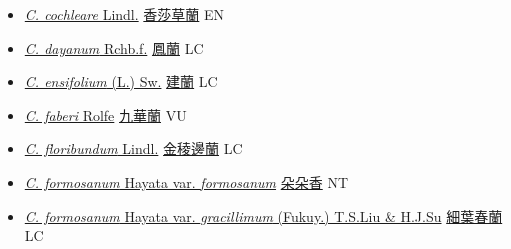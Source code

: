 \begin{itemize}
  \begin{itemize}
        \item[] \href{http://www.theplantlist.org/tpl1.1/search?q=Cymbidium+cochleare}{\textit{C. cochleare} Lindl.}   \href{\detokenize{http://taibnet.sinica.edu.tw/chi/taibnet_species_list.php?T2=香莎草蘭&T2_new_value=true&fr=y}}{香莎草蘭} EN
        \item[] \href{http://www.theplantlist.org/tpl1.1/search?q=Cymbidium+dayanum}{\textit{C. dayanum} Rchb.f.}   \href{\detokenize{http://taibnet.sinica.edu.tw/chi/taibnet_species_list.php?T2=鳳蘭&T2_new_value=true&fr=y}}{鳳蘭} LC
        \item[] \href{http://www.theplantlist.org/tpl1.1/search?q=Cymbidium+ensifolium}{\textit{C. ensifolium} (L.) Sw.}   \href{\detokenize{http://taibnet.sinica.edu.tw/chi/taibnet_species_list.php?T2=建蘭&T2_new_value=true&fr=y}}{建蘭} LC
        \item[] \href{http://www.theplantlist.org/tpl1.1/search?q=Cymbidium+faberi}{\textit{C. faberi} Rolfe}   \href{\detokenize{http://taibnet.sinica.edu.tw/chi/taibnet_species_list.php?T2=九華蘭&T2_new_value=true&fr=y}}{九華蘭} VU
        \item[] \href{http://www.theplantlist.org/tpl1.1/search?q=Cymbidium+floribundum}{\textit{C. floribundum} Lindl.}   \href{\detokenize{http://taibnet.sinica.edu.tw/chi/taibnet_species_list.php?T2=金稜邊蘭&T2_new_value=true&fr=y}}{金稜邊蘭} LC
        \item[] \href{http://www.theplantlist.org/tpl1.1/search?q=Cymbidium+formosanum+var.+formosanum}{\textit{C. formosanum} Hayata var. \textit{formosanum}}   \href{\detokenize{http://taibnet.sinica.edu.tw/chi/taibnet_species_list.php?T2=朵朵香&T2_new_value=true&fr=y}}{朵朵香} NT
        \item[] \href{http://www.theplantlist.org/tpl1.1/search?q=Cymbidium+formosanum+var.+gracillimum}{\textit{C. formosanum} Hayata var. \textit{gracillimum} (Fukuy.) T.S.Liu \& H.J.Su}     \href{\detokenize{http://taibnet.sinica.edu.tw/chi/taibnet_species_list.php?T2=細葉春蘭&T2_new_value=true&fr=y}}{細葉春蘭} LC

\end{itemize}
\end{itemize}
